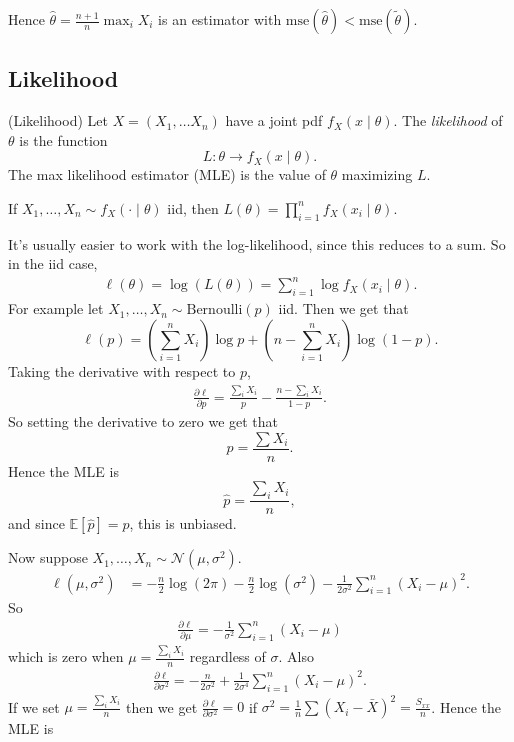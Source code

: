 \documentclass{article}
\begin{document}
Hence $ \hat\theta = \frac{n+1}n \max_i X_i $ is an estimator with $\text{mse}(\hat\theta)<\text{mse}(\tilde\theta) $.
\subsection{Likelihood}
\begin{definition}
	(Likelihood) Let $ X=(X_1,\dots X_n) $ have a joint pdf $ f_X(x\mid \theta) $. The \textit{likelihood} of $ \theta $ is the function
	\[
	  L:\theta \to f_X(x\mid\theta).
	\]
	The max likelihood estimator (MLE) is the value of $ \theta $ maximizing $ L $.
\end{definition}
	If $ X_1,\dots, X_n\sim f_X(\cdot\mid\theta) $ iid, then $ L(\theta) = \prod_{i=1}^n f_X(x_i\mid \theta) $. \par
It's usually easier to work with the log-likelihood, since this reduces to a sum. So in the iid case,
\begin{align*}
	\ell(\theta)= \log(L(\theta)) = \sum_{i=1}^n \log f_X(x_i\mid \theta).
\end{align*}
For example let $ X_1,\dots, X_n \sim \text{Bernoulli}(p)$ iid. Then we get that
\[
	\ell(p) = \left(\sum_{i=1}^n X_i\right)\log p + \left(n-\sum_{i=1}^n X_i\right) \log(1-p).
\]
Taking the derivative with respect to $ p $,
\begin{align*}
	\frac{\partial \ell}{\partial p} = \frac{\sum_i X_i} p - \frac{n-\sum_i X_i}{1-p}.
\end{align*}
So setting the derivative to zero we get that
\[
	p = \frac{\sum X_i} n.
\]
Hence the MLE is
\[
	\hat p = \frac{\sum_i X_i}n,
\]
and since $ \mathbb E[\hat p] = p $, this is unbiased.\par
Now suppose $ X_1,\dots, X_n\sim\mathcal N(\mu,\sigma^2) $.
\begin{align*}
	\ell(\mu,\sigma^2) &= -\frac n2 \log(2\pi) -\frac n2 \log(\sigma^2) -\frac 1{2\sigma^2} \sum_{i=1}^n (X_i-\mu)^2.
\end{align*}
So
\begin{align*}
	\frac{\partial \ell}{\partial \mu} = -\frac 1{\sigma^2} \sum_{i=1}^n (X_i - \mu) 
\end{align*}
which is zero when $ \mu = \frac{\sum_i X_i}n $ regardless of $ \sigma $. Also
\begin{align*}
	\frac{\partial \ell}{\partial \sigma^2} = -\frac{n}{2\sigma^2} + \frac 1{2\sigma^4} \sum_{i=1}^n (X_i-\mu)^2.
\end{align*}
If we set $ \mu = \frac{\sum_i X_i}n $ then we get $ \frac{\partial\ell}{\partial\sigma^2}=0 $ if $ \sigma^2 = \frac 1n \sum(X_i-\bar X)^2 = \frac {S_{xx}}n $. Hence the MLE is
\end{document}
